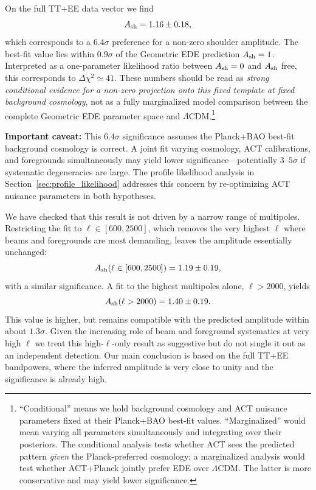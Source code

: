 \documentclass[a4paper,11pt]{article}
\begin{document}
On the full TT+EE data vector we find
\begin{equation}
A_{\rm sh} = 1.16 \pm 0.18,
\end{equation}
which corresponds to a $6.4\sigma$ preference for a non-zero shoulder amplitude. The best-fit value lies within $0.9\sigma$ of the Geometric EDE prediction $A_{\rm sh}=1$. Interpreted as a one-parameter likelihood ratio between $A_{\rm sh}=0$ and $A_{\rm sh}$ free, this corresponds to $\Delta\chi^2 \simeq 41$. These numbers should be read as \emph{strong conditional evidence for a non-zero projection onto this fixed template at fixed background cosmology}, not as a fully marginalized model comparison between the complete Geometric EDE parameter space and $\Lambda$CDM.\footnote{``Conditional'' means we hold background cosmology and ACT nuisance parameters fixed at their Planck+BAO best-fit values. ``Marginalized'' would mean varying all parameters simultaneously and integrating over their posteriors. The conditional analysis tests whether ACT sees the predicted pattern \emph{given} the Planck-preferred cosmology; a marginalized analysis would test whether ACT+Planck jointly prefer EDE over $\Lambda$CDM. The latter is more conservative and may yield lower significance.}

\textbf{Important caveat:} This $6.4\sigma$ significance assumes the Planck+BAO best-fit background cosmology is correct. A joint fit varying cosmology, ACT calibrations, and foregrounds simultaneously may yield lower significance---potentially $3$--$5\sigma$ if systematic degeneracies are large. The profile likelihood analysis in Section~\ref{sec:profile_likelihood} addresses this concern by re-optimizing ACT nuisance parameters in both hypotheses.

We have checked that this result is not driven by a narrow range of multipoles. Restricting the fit to $\ell \in [600,2500]$, which removes the very highest $\ell$ where beams and foregrounds are most demanding, leaves the amplitude essentially unchanged:
\begin{equation}
A_{\rm sh}(\ell\in[600,2500]) = 1.19 \pm 0.19,
\end{equation}
with a similar significance. A fit to the highest multipoles alone, $\ell > 2000$, yields
\begin{equation}
A_{\rm sh}(\ell>2000) = 1.40 \pm 0.19.
\end{equation}
This value is higher, but remains compatible with the predicted amplitude within about $1.3\sigma$. Given the increasing role of beam and foreground systematics at very high $\ell$ we treat this high-$\ell$-only result as suggestive but do not single it out as an independent detection. Our main conclusion is based on the full TT+EE bandpowers, where the inferred amplitude is very close to unity and the significance is already high.
\end{document}
